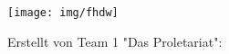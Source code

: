 
\begin{titlepage}

\begin{center}


\texttt{[image: img/fhdw]}\\

\vspace{.7cm}

\Huge{\bfseries\dokumententyp}

\vspace{0.5cm}

\LARGE{\dokumententitel}

\vspace{0.5cm}

\large{
	
\dokumentenuntertitel
	
\vspace{1cm}

Erstellt von Team 1 "Das Proletariat":\\~\\

}
\end{center}
\end{titlepage}
